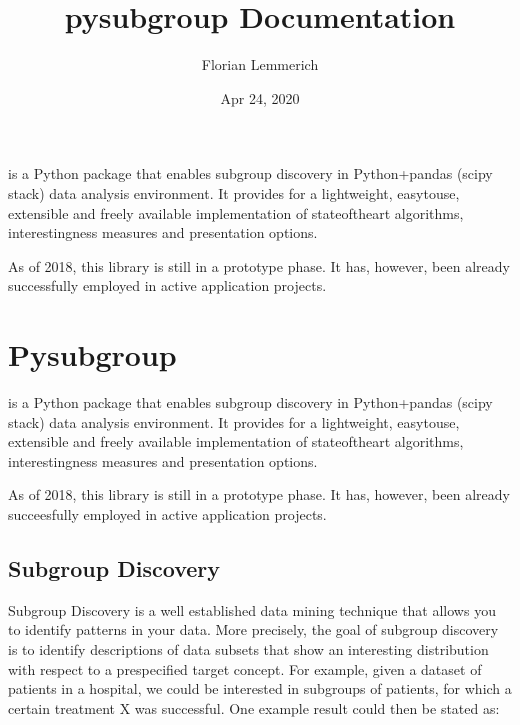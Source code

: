 \documentclass[letterpaper,10pt,english]{sphinxmanual}
\title{pysubgroup Documentation}
\date{Apr 24, 2020}
\author{Florian Lemmerich}
\begin{document}
\pagestyle{empty}
\sphinxmaketitle
\pagestyle{plain}
\sphinxtableofcontents
\pagestyle{normal}
\label{\detokenize{index::doc}}


 is a Python package that enables subgroup discovery in
Python+pandas (scipy stack) data analysis environment.
It provides for a lightweight, easy\sphinxhyphen{}to\sphinxhyphen{}use, extensible and freely available
implementation of state\sphinxhyphen{}of\sphinxhyphen{}the\sphinxhyphen{}art algorithms, interestingness measures and presentation options.

As of 2018, this library is still in a prototype phase.
It has, however, been already successfully employed in active application projects.


\chapter{Pysubgroup}
\label{\detokenize{tutorials/introduction:Pysubgroup}}\label{\detokenize{tutorials/introduction::doc}}
 is a Python package that enables subgroup discovery in Python+pandas (scipy stack) data analysis environment. It provides for a lightweight, easy\sphinxhyphen{}to\sphinxhyphen{}use, extensible and freely available implementation of state\sphinxhyphen{}of\sphinxhyphen{}the\sphinxhyphen{}art algorithms, interestingness measures and presentation options.

As of 2018, this library is still in a prototype phase. It has, however, been already succeesfully employed in active application projects.


\section{Subgroup Discovery}
\label{\detokenize{tutorials/introduction:Subgroup-Discovery}}
Subgroup Discovery is a well established data mining technique that allows you to identify patterns in your data. More precisely, the goal of subgroup discovery is to identify descriptions of data subsets that show an interesting distribution with respect to a pre\sphinxhyphen{}specified target concept. For example, given a dataset of patients in a hospital, we could be interested in subgroups of patients, for which a certain treatment X was successful. One example result could then be stated as:

\end{document}
